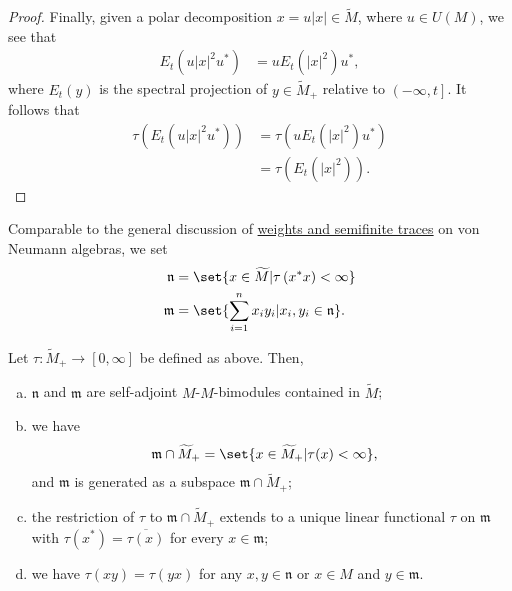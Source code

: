 \documentclass[10pt]{mypackage}
\begin{document}
\begin{proof}
  Finally, given a polar decomposition $x = u\left\vert x \right\vert\in \widetilde{M}$, where $u\in U\left( M \right)$, we see that 
  \begin{align*}
    E_t\left( u\left\vert x \right\vert^2u^{\ast} \right) &= uE_t\left( \left\vert x \right\vert^2 \right)u^{\ast},
  \end{align*}
  where $E_t(y)$ is the spectral projection of $y\in \widetilde{M}_+$ relative to $\left( -\infty,t \right]$. It follows that
  \begin{align*}
    \tau\left( E_t\left( u\left\vert x \right\vert^2u^{\ast} \right) \right) &= \tau\left( uE_t\left( \left\vert x \right\vert^2 \right)u^{\ast} \right)\\
                                                                             &= \tau\left( E_t\left( \left\vert x \right\vert^2 \right) \right).
  \end{align*}
\end{proof}
Comparable to the general discussion of \href{https://ai-bearing.github.io/Classes_and_Homework/After\%20College/Other\%20Notes/vna_projections.pdf}{weights and semifinite traces} on von Neumann algebras, we set
\begin{align*}
  \mathfrak{n} &= \set{x\in \widetilde{M} | \tau\left( x^{\ast}x \right) < \infty}\\
  \mathfrak{m} &= \set{\sum_{i=1}^{n}x_iy_i | x_i,y_i\in \mathfrak{n}}.
\end{align*}
\begin{lemma}
  Let $\tau\colon \widetilde{M}_{+}\rightarrow [0,\infty]$ be defined as above. Then,
  \begin{enumerate}[(a)]
    \item $ \mathfrak{n} $ and $ \mathfrak{m} $ are self-adjoint $M$-$M$-bimodules contained in $ \widetilde{M} $;
    \item we have
      \begin{align*}
        \mathfrak{m} \cap \widetilde{M}_{+} &= \set{ x\in \widetilde{M}_{+} | \tau(x) < \infty },
      \end{align*}
      and $ \mathfrak{m} $ is generated as a subspace $ \mathfrak{m}\cap \widetilde{M}_{+} $;
    \item the restriction of $\tau$ to $ \mathfrak{m}\cap \widetilde{M}_{+} $ extends to a unique linear functional $\tau$ on $ \mathfrak{m} $ with $\tau\left( x^{\ast} \right) = \overline{\tau(x)}$ for every $x\in \mathfrak{m}$;
    \item we have $\tau\left( xy \right) = \tau\left( yx \right)$ for any $x,y\in \mathfrak{n}$ or $x\in M$ and $y\in \mathfrak{m}$.
  \end{enumerate}
\end{lemma}
\end{document}
